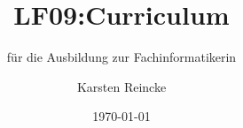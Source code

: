 \documentclass[]{beamer}
\title{LF09:Curriculum}
\subtitle{für die Ausbildung zur Fachinformatikerin}
\institute{GS-LDK}
\author{Karsten Reincke}
\date{\today}
\def\cfgGl{../../../cfg.gl/}
\begin{document}

\begin{frame}
  \titlepage
\end{frame}



%




\logo{}
\newpage



%
\end{document}
